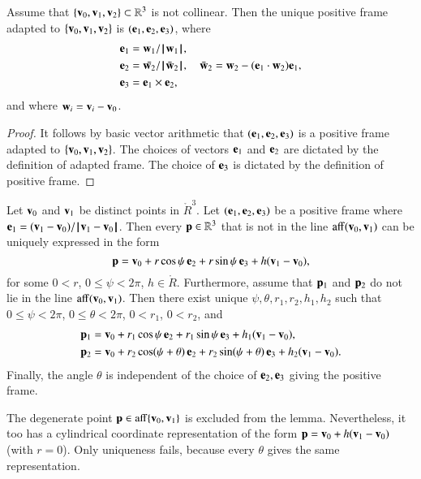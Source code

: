 \begin{lemma}[orthonormalization]
\label{lemma:frame}
  Assume that $\{{\mathbf v}_0,{\mathbf v}_1,{\mathbf v}_2\}\subset\mathbb{R}^3$ is not collinear.
  Then the unique positive frame adapted to 
  $\{{\mathbf v}_0,{\mathbf v}_1,{\mathbf v}_2\}$ is $({\mathbf e}_1,{\mathbf e}_2,{\mathbf e}_3)$, where
\begin{align*}
{\mathbf e}_1 &= {\mathbf w}_1/{{\hskip0.1em|\hskip-0.15em|\hskip0.1em}{\mathbf w}_1{\hskip0.1em|\hskip-0.15em|\hskip0.1em}},\\
{\mathbf e}_2 &= \bar{{\mathbf w}_2}/{{\hskip0.1em|\hskip-0.15em|\hskip0.1em}\bar{{\mathbf w}}_2{\hskip0.1em|\hskip-0.15em|\hskip0.1em}},\quad \bar{{\mathbf w}}_2 = {\mathbf w}_2 - ({\mathbf e}_1\cdot {\mathbf w}_2) {\mathbf e}_1,\\
{\mathbf e}_3 &= {\mathbf e}_1 \times {\mathbf e}_2,
\end{align*}
and where ${\mathbf w}_i = {\mathbf v}_i - {\mathbf v}_0$.
\end{lemma}

\begin{proof} It follows by basic vector arithmetic that
  $({\mathbf e}_1,{\mathbf e}_2,{\mathbf e}_3)$ is a positive frame adapted to
  $\{{\mathbf v}_0,{\mathbf v}_1,{\mathbf v}_2\}$.  The choices of vectors ${\mathbf e}_1$ and ${\mathbf e}_2$ are
  dictated by the definition of adapted frame.  The choice of ${\mathbf e}_3$
  is dictated by the definition of positive frame.
\end{proof}

\begin{lemma}
Let ${\mathbf v}_0$ and ${\mathbf v}_1$ be distinct points in 
$\ring{R}^3$.  Let $({\mathbf e}_1,{\mathbf e}_2,{\mathbf e}_3)$ be a positive frame 
where $\e_1 = (\v_1-\v_0)/\norm{\v_1}{\v_0}$.
Then every
${\mathbf p}\in\mathbb{R}^3$ that is not in the line ${\operatorname{aff}}({\mathbf v}_0,{\mathbf v}_1)$
can be uniquely expressed in the form
\[ 
{\mathbf p} = {\mathbf v}_0 + r\cos\psi\, {\mathbf e}_2 + r\sin\psi\, {\mathbf e}_3 + h ({\mathbf v}_1-{\mathbf v}_0),
\] 
%
%
for some $0< r$, $0\le \psi < 2\pi$, $h\in\ring{R}$.
Furthermore,
assume that ${\mathbf p}_1$ and ${\mathbf p}_2$ do
not lie in the line ${\operatorname{aff}}({\mathbf v}_0,{\mathbf v}_1)$.
Then there exist unique $\psi,\theta,r_1,r_2,h_1,h_2$
such
that $0\le\psi<2\pi$, $0\le\theta < 2\pi$, $0 < r_1$, $0 < r_2$, and
\begin{align*}
{\mathbf p}_1 &= {\mathbf v}_0 + r_1\cos\psi\, {\mathbf e}_2 + r_1\sin\psi\, {\mathbf e}_3 + h_1({\mathbf v}_1-{\mathbf v}_0),\\
{\mathbf p}_2 &= {\mathbf v}_0 + r_2\cos(\psi+\theta)\, {\mathbf e}_2 + r_2\sin(\psi+\theta)\, {\mathbf e}_3 
+ h_2({\mathbf v}_1-{\mathbf v}_0).
\end{align*}
Finally, the angle $\theta$ is independent of the choice of ${\mathbf e}_2,{\mathbf e}_3$
giving the positive frame.
\end{lemma}
%
%
%
%
%
%
%
The degenerate point ${\mathbf p}\in{\operatorname{aff}}\{{\mathbf v}_0,{\mathbf v}_1\}$ is excluded from the
lemma.  Nevertheless, it too has a cylindrical coordinate
representation of the form ${\mathbf p} = {\mathbf v}_0 + h({\mathbf v}_1-{\mathbf v}_0)$ (with $r=0$).
Only uniqueness fails, because every $\theta$ gives the same
representation.

